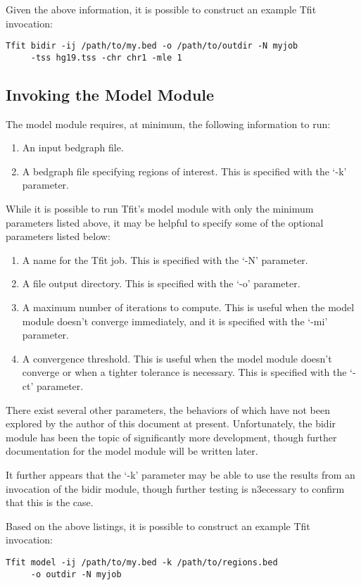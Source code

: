 \documentclass[12pt,letterpaper]{article}
\begin{document}
Given the above information, it is possible to construct an example Tfit invocation:
\begin{lstlisting}
Tfit bidir -ij /path/to/my.bed -o /path/to/outdir -N myjob 
     -tss hg19.tss -chr chr1 -mle 1
\end{lstlisting}

\subsection{Invoking the Model Module}
The model module requires, at minimum, the following information to run:
\begin{enumerate}
\item An input bedgraph file.
\item A bedgraph file specifying regions of interest. This is specified with the `-k' parameter.
\end{enumerate}

While it is possible to run Tfit's model module with only the minimum parameters listed above, it may be helpful to specify some of the optional parameters listed below:

\begin{enumerate}
\item A name for the Tfit job. This is specified with the `-N' parameter.
\item A file output directory. This is specified with the `-o' parameter.
\item A maximum number of iterations to compute. This is useful when the model module doesn't converge immediately, and it is specified with the `-mi' parameter.
\item A convergence threshold. This is useful when the model module doesn't converge or when a tighter tolerance is necessary. This is specified with the `-ct' parameter.
\end{enumerate}

There exist several other parameters, the behaviors of which have not been explored by the author of this document at present. Unfortunately, the bidir module has been the topic of significantly more development, though further documentation for the model module will be written later. 

It further appears that the `-k' parameter may be able to use the results from an invocation of the bidir module, though further testing is n3ecessary to confirm that this is the case.

Based on the above listings, it is possible to construct an example Tfit invocation:
\begin{lstlisting}
Tfit model -ij /path/to/my.bed -k /path/to/regions.bed 
     -o outdir -N myjob
\end{lstlisting}
\end{document}
